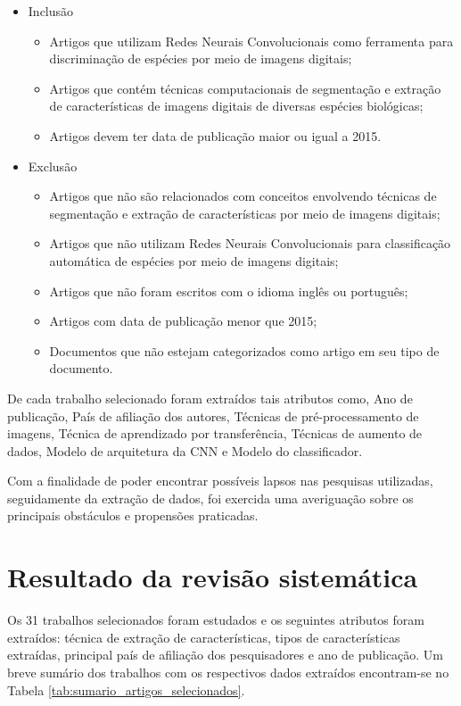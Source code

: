 \documentclass[
	12pt,				%
	oneside,			%
	a4paper,			%
	english,			%
	brazil				%
	]{abntex2ppgsi}
\begin{document}
\begin{itemize}
  \item Inclusão
    \begin{itemize}
        \item{Artigos que utilizam Redes Neurais Convolucionais como ferramenta para discriminação de espécies por meio de imagens digitais;}
        \item{Artigos que contém técnicas computacionais de segmentação e extração de características de imagens digitais de diversas espécies biológicas;}
        \item{Artigos devem ter data de publicação maior ou igual a 2015.}
    \end{itemize}
  \item Exclusão
    \begin{itemize}
        \item{Artigos que não são relacionados com conceitos envolvendo técnicas de segmentação e extração de características por meio de imagens digitais;}
        \item{Artigos que não utilizam Redes Neurais Convolucionais para classificação automática de espécies por meio de imagens digitais;}
        \item{Artigos que não foram escritos com o idioma inglês ou português;}
        \item{Artigos com data de publicação menor que 2015;}
        \item{Documentos que não estejam categorizados como artigo em seu tipo de documento.}
    \end{itemize}
\end{itemize}

De cada trabalho selecionado foram extraídos tais atributos como, Ano de publicação, País de afiliação dos autores, Técnicas de pré-processamento de imagens, Técnica de aprendizado por transferência, Técnicas de aumento de dados, Modelo de arquitetura da CNN e Modelo do classificador.

Com a finalidade de poder encontrar possíveis lapsos nas pesquisas utilizadas, seguidamente da extração de dados, foi exercida uma averiguação sobre os principais obstáculos e propensões praticadas.

\section{Resultado da revisão sistemática}
Os 31 trabalhos selecionados foram estudados e os seguintes atributos foram extraídos: técnica de extração de características, tipos de características extraídas, principal país de afiliação dos pesquisadores e ano de publicação. Um breve sumário dos trabalhos com os respectivos dados extraídos encontram-se no Tabela \ref{tab:sumario_artigos_selecionados}.
\end{document}
